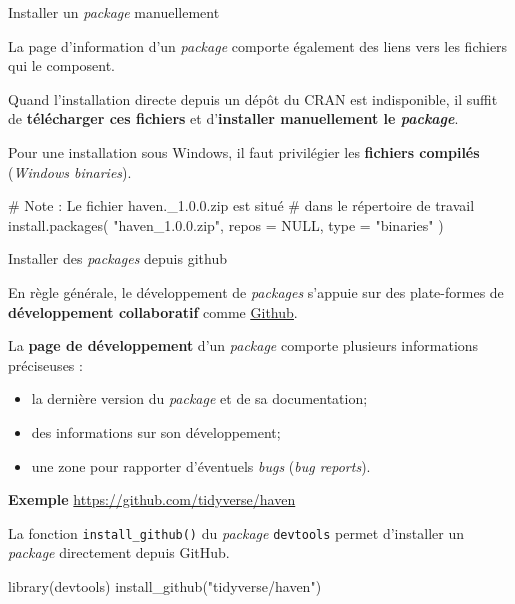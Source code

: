 \documentclass[12pt,handout,ignorenonframetext,]{beamer}
\newenvironment{Shaded}{}{}
\newcommand{\KeywordTok}[1]{\textcolor[rgb]{0.00,0.00,1.00}{{#1}}}
\newcommand{\DataTypeTok}[1]{{#1}}
\newcommand{\StringTok}[1]{\textcolor[rgb]{0.00,0.50,0.50}{{#1}}}
\newcommand{\CommentTok}[1]{\textcolor[rgb]{0.00,0.50,0.00}{{#1}}}
\newcommand{\OtherTok}[1]{\textcolor[rgb]{1.00,0.25,0.00}{{#1}}}
\newcommand{\NormalTok}[1]{{#1}}
\providecommand{\tightlist}{%
\setlength{\itemsep}{0pt}\setlength{\parskip}{0pt}}
\renewenvironment{Shaded}{\begin{snugshade}}{\end{snugshade}}
\begin{document}
\begin{frame}[fragile]{Installer un \emph{package} manuellement}

La page d'information d'un \emph{package} comporte également des liens
vers les fichiers qui le composent.

Quand l'installation directe depuis un dépôt du CRAN est indisponible,
il suffit de \textbf{télécharger ces fichiers} et d'\textbf{installer
manuellement le \emph{package}}.

Pour une installation sous Windows, il faut privilégier les
\textbf{fichiers compilés} (\emph{Windows binaries}).

\pause \small

\begin{Shaded}
\begin{Highlighting}[]
\CommentTok{# Note : Le fichier haven._1.0.0.zip est situé }
\CommentTok{# dans le répertoire de travail}
\KeywordTok{install.packages}\NormalTok{(}
  \StringTok{"haven_1.0.0.zip"}\NormalTok{, }\DataTypeTok{repos =} \OtherTok{NULL}\NormalTok{, }\DataTypeTok{type =} \StringTok{"binaries"}
\NormalTok{)}
\end{Highlighting}
\end{Shaded}

\end{frame}

\begin{frame}[fragile]{Installer des \emph{packages} depuis github}

En règle générale, le développement de \emph{packages} s'appuie sur des
plate-formes de \textbf{développement collaboratif} comme
\href{https://github.com}{\underline{Github}}.

\pause La \textbf{page de développement} d'un \emph{package} comporte
plusieurs informations préciseuses :

\begin{itemize}
\tightlist
\item
  la dernière version du \emph{package} et de sa documentation;
\item
  des informations sur son développement;
\item
  une zone pour rapporter d'éventuels \emph{bugs} (\emph{bug reports}).
\end{itemize}

\textbf{Exemple} \url{https://github.com/tidyverse/haven}

\pause La fonction \texttt{install\_github()} du \emph{package}
\texttt{devtools} permet d'installer un \emph{package} directement
depuis GitHub.

\begin{Shaded}
\begin{Highlighting}[]
\KeywordTok{library}\NormalTok{(devtools)}
\KeywordTok{install_github}\NormalTok{(}\StringTok{"tidyverse/haven"}\NormalTok{)}
\end{Highlighting}
\end{Shaded}

\end{frame}
\end{document}
